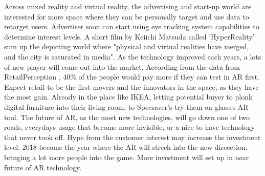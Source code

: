 \documentclass[12pt]{article}
\begin{document}
Across mixed reality and virtual reality, the advertising and start-up world are interested  for more space where they can be personally target and use data to retarget users. Advertiser soon can start using eye tracking system capabilities to determine interest levels. A short film by Keiichi Matsuda called 'HyperReality' sum up the depicting world where "physical and virtual realities have merged, and the city is saturated in media". As the technology improved each years, a lots of new player will come out into the market. According from the data from RetailPerception \cite{impat77}, 40\% of the people would pay more if they can test in AR first. Expect retail to be the first-movers and the innovators in the space, as they have the most gain. Already in the place like IKEA, letting potential buyer to plonk digital furniture into their living room, to Specsaver's try them on glasses AR tool. The future of AR, as the most new technologies, will go down one of two roads, everydays usage that become more invisible, or a nice to have technology that never took off. Hype from the customer interest may increase the investment level. 2018 become the year where the AR will strech into the new direection, bringing a lot more people into the game. More investment will set up in near future of AR technology.
\end{document}
